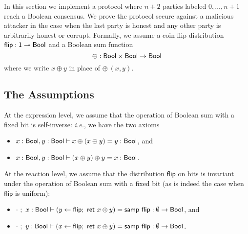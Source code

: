 \renewcommand{\flip}{\mathsf{flip}}
\renewcommand{\id}{\mathsf{id}}
\renewcommand{\adv}{\mathsf{adv}}
\newcommand{\party}{\mathsf{party}}
\newcommand{\comm}{\mathsf{comm}}
\renewcommand{\Flip}{\mathsf{Flip}}
\newcommand{\Commit}{\mathsf{Commit}}
\newcommand{\Committed}{\mathsf{Committed}}
\newcommand{\Open}{\mathsf{Open}}
\newcommand{\Opened}{\mathsf{Opened}}
\newcommand{\SumCommit}{\mathsf{SumCommit}}
\newcommand{\AllCommitted}{\mathsf{AllCommitted}}
\newcommand{\AllOpen}{\mathsf{AllOpen}}
\newcommand{\SumOpened}{\mathsf{SumOpened}}
\renewcommand{\Out}{\mathsf{Out}}
\newcommand{\LastCommit}{\mathsf{LastCommit}}
\renewcommand{\LeakFlip}{\mathsf{LeakFlip}}
\newcommand{\Ok}{\mathsf{Ok}}
\newcommand{\AdvCommit}{\mathsf{AdvCommit}}
\newcommand{\LeakCommitted}{\mathsf{LeakCommitted}}
\newcommand{\AdvOpen}{\mathsf{AdvOpen}}
\newcommand{\LeakOpened}{\mathsf{LeakOpened}}

In this section we implement a protocol where $n+2$ parties labeled $0,\ldots,n+1$ reach a Boolean consensus. We prove the protocol secure against a malicious attacker in the case when the last party is honest and any other party is arbitrarily honest or corrupt. Formally, we assume a coin-flip distribution $\flip : \one \twoheadrightarrow \Bool$ and a Boolean sum function \[\oplus : \mathsf{Bool} \times \mathsf{Bool} \rightarrow \mathsf{Bool}\] where we write $x \oplus y$ in place of $\oplus \ (x,y)$.

\subsection{The Assumptions}
At the expression level, we assume that the operation of Boolean sum with a fixed bit is self-inverse: \emph{i.e.}, we have the two axioms
\begin{itemize}
\item $x : \mathsf{Bool}, y : \mathsf{Bool} \vdash x \oplus (x \oplus y) = y : \mathsf{Bool}$, and  
\item $x : \mathsf{Bool}, y : \mathsf{Bool} \vdash (x \oplus y) \oplus y = x : \mathsf{Bool}$.
\end{itemize}
At the reaction level, we assume that the distribution $\flip$ on bits is invariant under the operation of Boolean sum with a fixed bit (as is indeed the case when $\flip$ is uniform):
\begin{itemize}
\item $\cdot \ ; \ x : \Bool \vdash (y \leftarrow \flip; \ \ret{x \oplus y}) = \samp{\flip} : \emptyset \to \Bool$, and
\item $\cdot \ ; \ y : \Bool \vdash (x \leftarrow \flip; \ \ret{x \oplus y}) = \samp{\flip} : \emptyset \to \Bool$.
\end{itemize}

